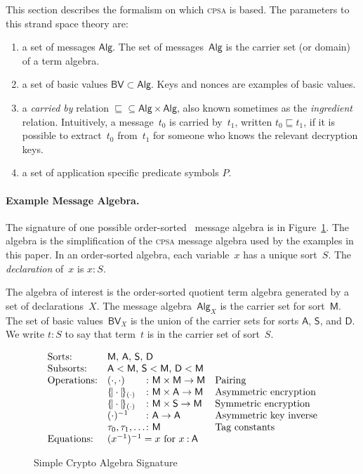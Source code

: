 \documentclass[12pt]{article}
\newcommand{\cpsa}{\textsc{cpsa}}
\newcommand{\enc}[2]{\ensuremath{\{\!|#1|\!\}_{#2}}}
\newcommand{\typ}{\mathbin:}
\newcommand{\srt}[1]{\ensuremath{\mathsf{#1}}}
\newcommand{\alg}[1]{\ensuremath{\mathsf{#1}}}
\newcommand{\msg}{\alg{Alg}}
\newcommand{\atm}{\alg{BV}}
\newcommand{\atom}{basic value}
\begin{document}
This section describes the formalism on which {\cpsa} is based.  The
parameters to this strand space theory are:
\begin{enumerate}
  \item a set of messages \msg.  The set of messages~{\msg} is the
  carrier set (or domain) of a term algebra.
  \item a set of {\atom}s $\atm\subset\msg$.  Keys and nonces are
  examples of {\atom}s.
  \item a \emph{carried by} relation
  ${\sqsubseteq}\subseteq\msg\times\msg$, also known sometimes as the
  \emph{ingredient} relation.  Intuitively, a message~$t_0$ is carried
  by~$t_1$, written $t_0\sqsubseteq t_1$, if it is possible to
  extract~$t_0$ from~$t_1$ for someone who knows the relevant
  decryption keys.
  \item a set of application specific predicate symbols $P$.
\end{enumerate}

\paragraph{Example Message Algebra.}
The signature of one possible order-sorted~\cite{GoguenMeseguer92}
message algebra is in Figure~\ref{fig:signature}.  The algebra is the
simplification of the {\cpsa} message algebra used by the examples in
this paper.  In an order-sorted algebra, each variable~$x$ has a
unique sort~$S$.  The \emph{declaration} of~$x$ is $x\typ S$.

The algebra of interest is the order-sorted quotient term algebra
generated by a set of declarations~$X$.  The message algebra~$\msg_X$
is the carrier set for sort~\srt{M}.  The set of {\atom}s~$\atm_X$ is
the union of the carrier sets for sorts \srt{A}, \srt{S}, and \srt{D}.
We write $t\typ S$ to say that term~$t$ is in the carrier set of
sort~$S$.

\begin{figure}
$$\begin{array}{ll@{{}\colon{}}ll}
\mbox{Sorts:}&
\multicolumn{3}{l}{\mbox{\srt{M}, \srt{A}, \srt{S}, \srt{D}}}\\
\mbox{Subsorts:}&
\multicolumn{3}{l}{\mbox{$\srt{A}<\srt{M}$, $\srt{S}<\srt{M}$,
    $\srt{D}<\srt{M}$}}\\
\mbox{Operations:}&(\cdot,\cdot)&\srt{M}\times\srt{M}\to\srt{M}
&\mbox{Pairing}\\
&\enc{\cdot}{(\cdot)}&\srt{M}\times\srt{A}\to\srt{M}
&\mbox{Asymmetric encryption}\\
&\enc{\cdot}{(\cdot)}&\srt{M}\times\srt{S}\to\srt{M}
&\mbox{Symmetric encryption}\\
&(\cdot)^{-1}&\srt{A}\to\srt{A}
&\mbox{Asymmetric key inverse}\\
&\tau_0,\tau_1,\ldots&\srt{M}
&\mbox{Tag constants}\\
\mbox{Equations:}&\multicolumn{3}{l}{(x^{-1})^{-1}=x\mbox{ for $x\typ\srt{A}$}}
\end{array}$$
\caption{Simple Crypto Algebra Signature}\label{fig:signature}
\end{figure}
\end{document}
